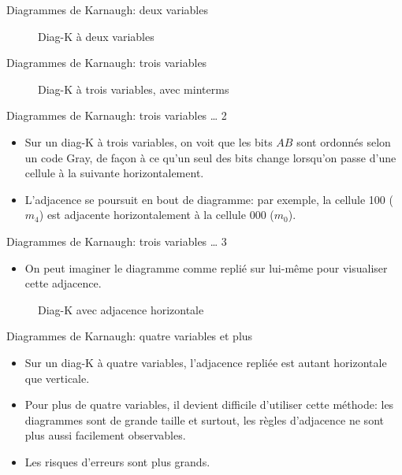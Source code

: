 \documentclass[presentation]{beamer}
\begin{document}
\begin{frame}[label={sec:org972ee0e}]{Diagrammes de Karnaugh: deux variables}
\begin{figure}[htbp]
\centering

\caption{\label{fig:orgf540a29}Diag-K à deux variables}
\end{figure}
\end{frame}

\begin{frame}[label={sec:org5decac2}]{Diagrammes de Karnaugh: trois variables}
\begin{figure}[htbp]
\centering

\caption{\label{fig:org9bcc2ac}Diag-K à trois variables, avec minterms}
\end{figure}
\end{frame}

\begin{frame}[label={sec:orgc526ccf}]{Diagrammes de Karnaugh: trois variables \ldots{} 2}
\begin{itemize}
\item Sur un diag-K à trois variables, on voit que les bits \(AB\) sont ordonnés selon un code Gray, de façon à ce qu'un seul des bits change lorsqu'on passe d'une cellule à la suivante horizontalement.

\item L'adjacence se poursuit en bout de diagramme: par exemple, la cellule 100 (\(m_4\)) est adjacente horizontalement à la cellule 000 (\(m_0\)).
\end{itemize}
\end{frame}

\begin{frame}[label={sec:org9954f41}]{Diagrammes de Karnaugh: trois variables \ldots{} 3}
\begin{itemize}
\item On peut imaginer le diagramme comme replié sur lui-même pour visualiser cette adjacence.
\end{itemize}

\begin{figure}[htbp]
\centering

\caption{\label{fig:orgd7a12c9}Diag-K avec adjacence horizontale}
\end{figure}
\end{frame}

\begin{frame}[label={sec:orgfb12d06}]{Diagrammes de Karnaugh: quatre variables et plus}
\begin{itemize}
\item Sur un diag-K à quatre variables, l'adjacence repliée est autant horizontale que verticale.

\item Pour plus de quatre variables, il devient difficile d'utiliser cette méthode: les diagrammes sont de grande taille et surtout, les règles d'adjacence ne sont plus aussi facilement observables.

\item Les risques d'erreurs sont plus grands.
\end{itemize}
\end{frame}
\end{document}
